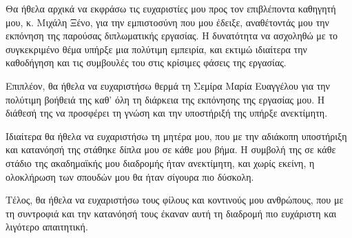 \begin{acknowledgements}
    Θα ήθελα αρχικά να εκφράσω τις ευχαριστίες μου προς τον επιβλέποντα καθηγητή μου, κ. Μιχάλη Ξένο, για την εμπιστοσύνη που μου έδειξε, αναθέτοντάς μου την εκπόνηση της παρούσας διπλωματικής εργασίας. Η δυνατότητα να ασχοληθώ με το συγκεκριμένο θέμα υπήρξε μια πολύτιμη εμπειρία, και εκτιμώ ιδιαίτερα την καθοδήγηση και τις συμβουλές του στις κρίσιμες φάσεις της εργασίας.

    Επιπλέον, θα ήθελα να ευχαριστήσω θερμά τη Σεμίρα Μαρία Ευαγγέλου για την πολύτιμη βοήθειά της καθ’ όλη τη διάρκεια της εκπόνησης της εργασίας μου. Η διάθεσή της να προσφέρει τη γνώση και την υποστήριξή της υπήρξε ανεκτίμητη.

    Ιδιαίτερα θα ήθελα να ευχαριστήσω τη μητέρα μου, που με την αδιάκοπη υποστήριξη και κατανόησή της στάθηκε δίπλα μου σε κάθε μου βήμα. Η συμβολή της σε κάθε στάδιο της ακαδημαϊκής μου διαδρομής ήταν ανεκτίμητη, και χωρίς εκείνη, η ολοκλήρωση των σπουδών μου θα ήταν σίγουρα πιο δύσκολη.

    Τέλος, θα ήθελα να ευχαριστήσω τους φίλους και κοντινούς μου ανθρώπους, που με τη συντροφιά και την κατανόησή τους έκαναν αυτή τη διαδρομή πιο ευχάριστη και λιγότερο απαιτητική.
\end{acknowledgements}

